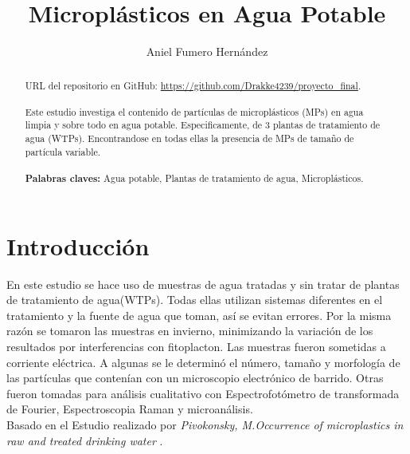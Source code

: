 \documentclass[a4paper,11pt]{article}
\title{Microplásticos en Agua Potable}
\author{Aniel Fumero Hernández}
\begin{document}
\maketitle
	\begin{abstract}
	
	URL del repositorio en GitHub:  \href{https://github.com/Drakke4239/proyecto\_final}{https://github.com/Drakke4239/proyecto\_final}.\\
	\\Este estudio investiga el contenido de partículas de microplásticos (MPs) en agua limpia y sobre todo en agua potable. Especificamente, de 3 plantas de tratamiento de agua (WTPs). Encontrandose en todas ellas la presencia de MPs de tamaño de partícula variable.\\\\
	\textbf{Palabras claves:} Agua potable, Plantas de tratamiento de agua, Microplásticos.
	
	\end{abstract}
\tableofcontents
\section{Introducción}
En este estudio se hace uso de muestras de agua tratadas y sin tratar de plantas de tratamiento de agua(WTPs). Todas ellas utilizan sistemas diferentes en el tratamiento y la fuente de agua que toman, así se evitan errores. Por la misma razón se tomaron las muestras en invierno, minimizando la variación de los resultados por interferencias con fitoplacton.
Las muestras fueron sometidas a corriente eléctrica. A algunas se le determinó el número, tamaño y morfología de las partículas que contenían con un microscopio electrónico de barrido. Otras fueron tomadas para análisis cualitativo con Espectrofotómetro de transformada de Fourier, Espectroscopia Raman y microanálisis.\\
Basado en el Estudio realizado por \textit{Pivokonsky, M.Occurrence of microplastics in raw and treated drinking water} \cite{Pivokonsky2018}.
\end{document}

